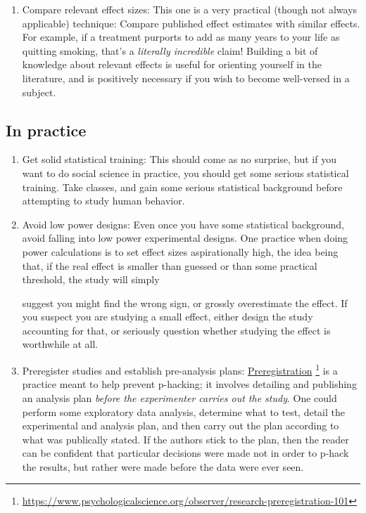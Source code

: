 \documentclass{tufte-handout}
\begin{document}
\begin{enumerate}
\item Compare relevant effect sizes:
\label{sec:org85dbfa4}
This one is a very practical (though not always applicable) technique: Compare
published effect estimates with similar effects. For example, if a treatment
purports to add as many years to your life as quitting smoking, that's a
\emph{literally incredible} claim! Building a bit of knowledge about relevant effects
is useful for orienting yourself in the literature, and is positively necessary
if you wish to become well-versed in a subject.
\end{enumerate}

\subsection{In practice}
\label{sec:orgaa9fbb3}
\begin{enumerate}
\item Get solid statistical training:
\label{sec:org2812db9}
This should come as no surprise, but if you want to do social science in
practice, you should get some serious statistical training. Take classes, and
gain some serious statistical background before attempting to study human
behavior.
\item Avoid low power designs:
\label{sec:org9f824b7}
Even once you have some statistical background, avoid falling into low power
experimental designs. One practice when doing power calculations is to set
effect sizes aspirationally high, the idea being that, if the real effect is
smaller than guessed or than some practical threshold, the study will simply

suggest you might find the wrong sign, or grossly overestimate the effect. If
you suspect you are studying a small effect, either design the study accounting
for that, or seriously question whether studying the effect is worthwhile at
all.
\item Preregister studies and establish pre-analysis plans:
\label{sec:org0acaa95}
\href{https://www.psychologicalscience.org/observer/research-preregistration-101}{Preregistration}
\footnote{\url{https://www.psychologicalscience.org/observer/research-preregistration-101}}
is  a practice  meant  to  help prevent  p-hacking;  it  involves detailing  and
publishing an analysis plan \emph{before the experimenter carries out the study}. One
could perform some exploratory data analysis, determine what to test, detail the
experimental and  analysis plan, and then  carry out the plan  according to what
was publically stated. If the authors stick  to the plan, then the reader can be
confident  that particular  decisions  were  made not  in  order  to p-hack  the
results, but rather were made before the data were ever seen.
\end{enumerate}
\end{document}
